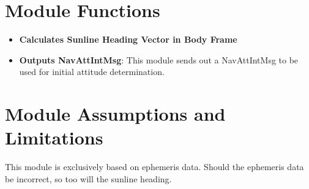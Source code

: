 

\section{Module Functions}
\begin{itemize}
	\item \textbf{Calculates Sunline Heading Vector in Body Frame}
	\item \textbf{Outputs NavAttIntMsg}: This module sends out a NavAttIntMsg to be used for initial attitude determination.
\end{itemize}

\section{Module Assumptions and Limitations}
This module is exclusively based on ephemeris data. Should the ephemeris data be incorrect, so too will the sunline heading.